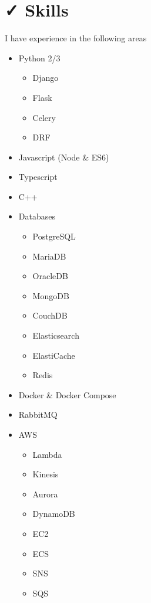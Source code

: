 \documentclass{resume}
\begin{document}
\section{{\faCheck} Skills}
I have experience in the following areas \\
\bigskip
\begin{minipage}[t]{0.3\textwidth}
  \begin{itemize}
    \item Python 2/3
    \begin{itemize}
      \item Django
      \item Flask
      \item Celery
      \item DRF
    \end{itemize}
    \item Javascript (Node \& ES6)
    \item Typescript
    \item C++
  \end{itemize}
\end{minipage}
\begin{minipage}[t]{0.3\textwidth}
  \begin{itemize}
    \item Databases
    \begin{itemize}
      \item PostgreSQL
      \item MariaDB
      \item OracleDB
      \item MongoDB
      \item CouchDB
      \item Elasticsearch
      \item ElastiCache
      \item Redis
    \end{itemize}
    \item Docker \& Docker Compose
    \item RabbitMQ
  \end{itemize}
\end{minipage}
\begin{minipage}[t]{0.3\textwidth}
  \begin{itemize}
    \item AWS
    \begin{itemize}
      \item Lambda
      \item Kinesis
      \item Aurora
      \item DynamoDB
      \item EC2
      \item ECS
      \item SNS
      \item SQS
    \end{itemize}
  \end{itemize}
\end{minipage}
\end{document}
